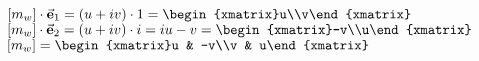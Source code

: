 \begin{exercise}{20}
\begin{enumerate}
          $[\Mw]\cdot \Vect{e}_1 = (u + iv) \cdot 1 
                                 = \begin{xmatrix}u\\v\end{xmatrix} \\$
          $[\Mw]\cdot \Vect{e}_2 = (u + iv) \cdot i = iu - v
                                 = \begin{xmatrix}-v\\u\end{xmatrix} \\$
          $[\Mw] = \begin{xmatrix}u & -v\\v & u\end{xmatrix}$
  \end{enumerate}
\end{exercise}
